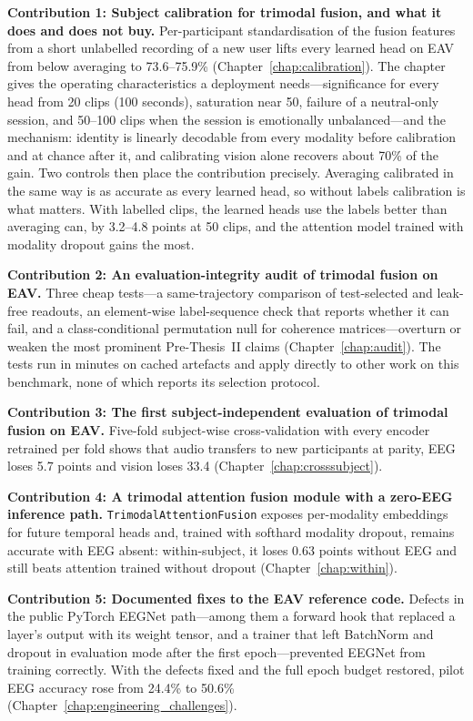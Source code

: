 \textbf{Contribution 1: Subject calibration for trimodal fusion, and what it does and does not buy.} Per-participant standardisation of the fusion features from a short unlabelled recording of a new user lifts every learned head on EAV from below averaging to 73.6--75.9\% (Chapter~\ref{chap:calibration}). The chapter gives the operating characteristics a deployment needs---significance for every head from 20 clips (100 seconds), saturation near 50, failure of a neutral-only session, and 50--100 clips when the session is emotionally unbalanced---and the mechanism: identity is linearly decodable from every modality before calibration and at chance after it, and calibrating vision alone recovers about 70\% of the gain. Two controls then place the contribution precisely. Averaging calibrated in the same way is as accurate as every learned head, so without labels calibration is what matters. With labelled clips, the learned heads use the labels better than averaging can, by 3.2--4.8 points at 50 clips, and the attention model trained with modality dropout gains the most.

\textbf{Contribution 2: An evaluation-integrity audit of trimodal fusion on EAV.} Three cheap tests---a same-trajectory comparison of test-selected and leak-free readouts, an element-wise label-sequence check that reports whether it can fail, and a class-conditional permutation null for coherence matrices---overturn or weaken the most prominent Pre-Thesis~II claims (Chapter~\ref{chap:audit}). The tests run in minutes on cached artefacts and apply directly to other work on this benchmark, none of which reports its selection protocol.

\textbf{Contribution 3: The first subject-independent evaluation of trimodal fusion on EAV.} Five-fold subject-wise cross-validation with every encoder retrained per fold shows that audio transfers to new participants at parity, EEG loses 5.7 points and vision loses 33.4 (Chapter~\ref{chap:crosssubject}).

\textbf{Contribution 4: A trimodal attention fusion module with a zero-EEG inference path.} \texttt{TrimodalAttentionFusion} exposes per-modality embeddings for future temporal heads and, trained with softhard modality dropout, remains accurate with EEG absent: within-subject, it loses 0.63 points without EEG and still beats attention trained without dropout (Chapter~\ref{chap:within}).

\textbf{Contribution 5: Documented fixes to the EAV reference code.} Defects in the public PyTorch EEGNet path---among them a forward hook that replaced a layer's output with its weight tensor, and a trainer that left BatchNorm and dropout in evaluation mode after the first epoch---prevented EEGNet from training correctly. With the defects fixed and the full epoch budget restored, pilot EEG accuracy rose from 24.4\% to 50.6\% (Chapter~\ref{chap:engineering_challenges}).

